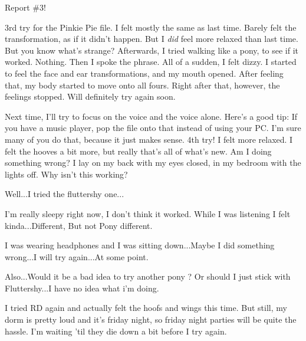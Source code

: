 \documentclass[ebook,12pt,oneside,openany]{memoir}
\begin{document}
\begin{tcolorbox}[title=Shining Wing,colback=blue!5!white,colframe=blue!75!black,coltitle=white]
\par{Report \#3!}
\newline{}
\par{3rd try for the Pinkie Pie file. I felt mostly the same as last time. Barely felt the transformation, as if it didn't happen. But I \textit{did} feel more relaxed than last time. But you know what's strange? Afterwards, I tried walking like a pony, to see if it worked. Nothing. Then I spoke the phrase. All of a sudden, I felt dizzy. I started to feel the face and ear transformations, and my mouth opened. After feeling that, my body started to move onto all fours. Right after that, however, the feelings stopped. Will definitely try again soon.}
\newline{}
\par{Next time, I'll try to focus on the voice and the voice alone. Here's a good tip: If you have a music player, pop the file onto that instead of using your PC. I'm sure many of you do that, because it just makes sense.}
\newline{}
\newline{}
4th try! I felt more relaxed. I felt the hooves a bit more, but really that's all of what's new. Am I doing something wrong? I lay on my back with my eyes closed, in my bedroom with the lights off. Why isn't this working?\end{tcolorbox}
\begin{tcolorbox}[title=Miss Light Diamond]
\par{Well...I tried the fluttershy one...}
\par{I'm really sleepy right now, I don't think it worked. While I was listening I felt kinda...Different, But not Pony different.}
\par{I was wearing headphones and I was sitting down...Maybe I did something wrong...I will try again...At some point.}
\par{Also...Would it be a bad idea to try another pony ? Or should I just stick with Fluttershy...I have no idea what i'm doing.}
\end{tcolorbox}
\begin{tcolorbox}[title=C. Thunder Dash,colback=orange!5!white,colframe=orange!75!black,coltitle=white]
\par{I tried RD again and actually felt the hoofs and wings this time. But still, my dorm is pretty loud and it's friday night, so friday night parties will be quite the hassle. I'm waiting 'til they die down a bit before I try again. }
\end{tcolorbox}
\end{document}
